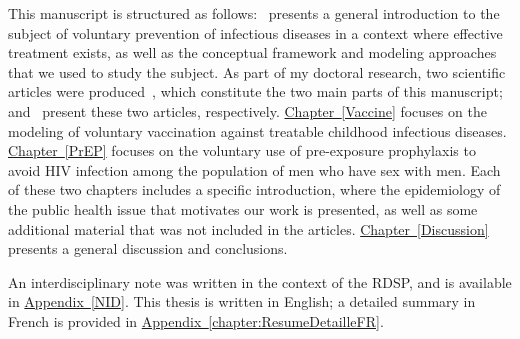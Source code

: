 This manuscript is structured as follows:~ presents a general introduction to the subject of voluntary prevention of infectious diseases in a context where effective treatment exists, as well as the conceptual framework and modeling approaches that we used to study the subject. As part of my doctoral research, two scientific articles were 
produced~\cite[]{Jijon2017,Jijon2021}, which constitute the two main parts of this manuscript;~ and~ present these two articles, respectively. \hyperlink{Vaccine}{Chapter~\ref*{Vaccine}} focuses on the modeling of voluntary vaccination against treatable childhood infectious diseases. \hyperlink{PrEP}{Chapter~\ref*{PrEP}} focuses on the voluntary use of pre-exposure prophylaxis to avoid HIV infection among the population of men who have sex with men. Each of these two chapters includes a specific introduction, where the epidemiology of the public health issue that motivates our work is presented, as well as some additional material that was not included in the articles. \hyperlink{Discussion}{Chapter~\ref*{Discussion}} presents a general discussion and conclusions. 

An interdisciplinary note was written in the context of the RDSP, and is available in \hyperlink{NID}{Appendix~\ref*{NID}}. This thesis is written in English; a detailed summary in French is provided in \hyperlink{chapter:ResumeDetailleFR}{Appendix~\ref*{chapter:ResumeDetailleFR}}.